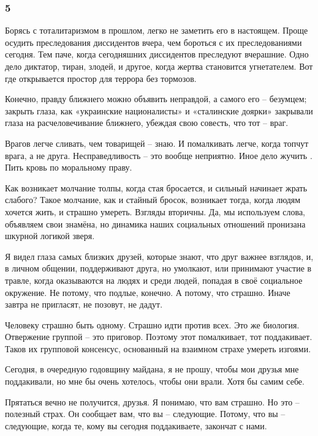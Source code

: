  
 
 
 
 
\subsubsection{5}
\label{sec:22_11_2021.fb.uljanov_anatolij.1.maidan.5}

Борясь с тоталитаризмом в прошлом, легко не заметить его в настоящем. Проще
осудить преследования диссидентов вчера, чем бороться с их преследованиями
сегодня. Тем паче, когда сегодняшних диссидентов преследуют вчерашние. Одно
дело диктатор, тиран, злодей, и другое, когда жертва становится угнетателем.
Вот где открывается простор для террора без тормозов.

Конечно, правду ближнего можно объявить неправдой, а самого его – безумцем;
закрыть глаза, как «украинские националисты» и «сталинские доярки» закрывали
глаза на расчеловечивание ближнего, убеждая свою совесть, что тот – враг. 

Врагов легче сливать, чем товарищей – знаю. И помалкивать легче, когда топчут
врага, а не друга. Несправедливость – это вообще неприятно. Иное дело жучить
. Пить  кровь по моральному праву.

Как возникает молчание толпы, когда стая бросается, и сильный начинает жрать
слабого? Такое молчание, как и стайный бросок, возникает тогда, когда людям
хочется жить, и страшно умереть. Взгляды вторичны. Да, мы используем слова,
объявляем свои знамёна, но динамика наших социальных отношений пронизана
шкурной логикой зверя. 

Я видел глаза самых близких друзей, которые знают, что друг важнее взглядов, и,
в личном общении, поддерживают друга, но умолкают, или принимают участие в
травле, когда оказываются на людях и среди людей, попадая в своё социальное
окружение. Не потому, что подлые, конечно. А потому, что страшно. Иначе завтра
не пригласят, не позовут, не дадут. 

Человеку страшно быть одному. Страшно идти против всех. Это же биология.
Отвержение группой – это приговор. Поэтому этот помалкивает, тот поддакивает.
Таков их групповой консенсус, основанный на взаимном страхе умереть изгоями.

Сегодня, в очередную годовщину майдана, я не прошу, чтобы мои друзья мне
поддакивали, но мне бы очень хотелось, чтобы они врали. Хотя бы самим себе.

Прятаться вечно не получится, друзья. Я понимаю, что вам страшно. Но это –
полезный страх. Он сообщает вам, что вы – следующие. Потому, что вы –
следующие, когда те, кому вы сегодня поддакиваете, закончат с нами.
